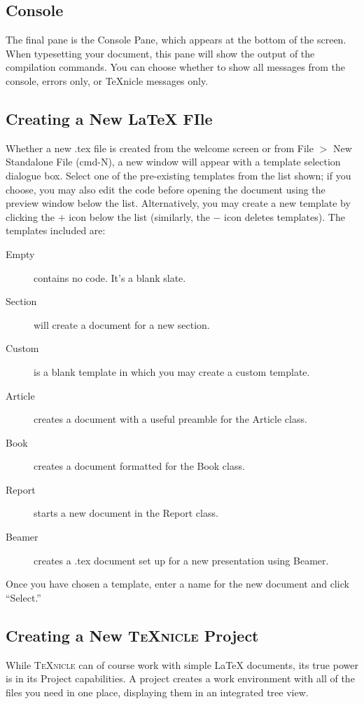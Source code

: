 \documentclass[11pt]{report}
\newcommand{\texnicle}{\textsc{TeXnicle}\xspace}
\begin{document}
\subsection{Console}

The final pane is the Console Pane, which appears at the bottom of the screen. When typesetting your document, this pane will show the output of the compilation commands. You can choose whether to show all messages from the console, errors only, or TeXnicle messages only.

\subsection{Creating a New {\LaTeX} FIle}
\label{userguide.newdoc}
Whether a new {}.tex file is created from the welcome screen or from File $>$ New Standalone {\LaTex} File (cmd-N), a new window will appear with a template selection dialogue box. Select one of the pre-existing templates from the list shown; if you choose, you may also edit the code before opening the document using the preview window below the list. Alternatively, you may create a new template by clicking the $+$ icon below the list (similarly, the $-$ icon deletes templates). The templates included are:
	\begin{description}
		\item[Empty] contains no code. It's a blank slate.
		\item[Section] will create a document for a new section.
		\item[Custom] is a blank template in which you may create a custom template.
		\item[Article] creates a document with a useful preamble for the Article class.
		\item[Book] creates a document formatted for the Book class.
		\item[Report] starts a new document in the Report class.
		\item[Beamer] creates a {}.tex document set up for a new presentation using Beamer.
	\end{description}

Once you have chosen a template, enter a name for the new document and click ``Select.''

\subsection{Creating a New \texnicle Project}
\label{userguide.newproject}
While \texnicle can of course work with simple {\LaTeX} documents, its true power is in its Project capabilities. A project creates a work environment with all of the files you need in one place, displaying them in an integrated tree view.
\end{document}
